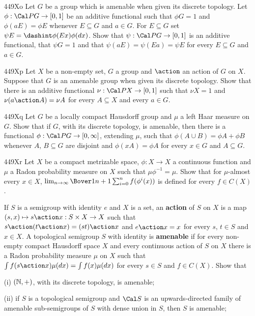 {\sqheader 449Xo Let $G$ be a group which is amenable when given its
discrete topology.   Let $\phi:\Cal PG\to[0,1]$ be an additive
functional such that $\phi G=1$ and $\phi(aE)=\phi E$ whenever
$E\subseteq G$ and $a\in G$.   For $E\subseteq G$ set
$\psi E=\dashint\phi(Ex)\phi(dx)$.   Show that
$\psi:\Cal PG\to[0,1]$ is an additive functional, that
$\psi G=1$ and that $\psi(aE)=\psi(Ea)=\psi E$ for
every $E\subseteq G$ and $a\in G$.

\spheader 449Xp Let $X$ be a non-empty set, $G$ a group and $\action$
an action of $G$ on $X$.   Suppose that $G$ is an amenable group when
given its discrete topology.   Show that there is an additive functional
$\nu:\Cal PX\to[0,1]$ such that $\nu X=1$ and
$\nu(a\action A)=\nu A$ for every $A\subseteq X$ and every $a\in G$.

\spheader 449Xq
Let $G$ be a locally compact Hausdorff group and
$\mu$ a left Haar measure on $G$.   Show that if $G$, with its discrete
topology, is amenable, then there is a functional
$\phi:\Cal PG\to[0,\infty]$, extending $\mu$, such that
$\phi(A\cup B)=\phi A+\phi B$ whenever $A$, $B\subseteq G$
are disjoint and $\phi(xA)=\phi A$ for every $x\in G$ and
$A\subseteq G$.

\spheader 449Xr Let $X$ be a compact metrizable space, $\phi:X\to X$ a
continuous function and $\mu$ a Radon probability measure on $X$ such
that $\mu\phi^{-1}=\mu$.   Show that for $\mu$-almost every $x\in X$,
$\lim_{n\to\infty}\Bover1{n+1}\sum_{i=0}^nf(\phi^i(x))$ is defined for
every $f\in C(X)$.   

If $S$ is a semigroup with identity $e$ and $X$ is a set, an
{\bf action} of $S$ on $X$ is a map
$(s,x)\mapsto s\action x:S\times X\to X$
such that $s\action(t\action x)=(st)\action x$ and $e\action x=x$ for
every $s$, $t\in S$ and $x\in X$.   A topological semigroup $S$ with
identity is {\bf amenable} if for every non-empty compact Hausdorff
space $X$ and every continuous action of $S$ on $X$ there is a Radon
probability measure $\mu$ on $X$ such that
$\int f(s\action x)\mu(dx)=\int f(x)\mu(dx)$ for every $s\in S$ and
$f\in C(X)$.   Show that

\quad(i) $(\Bbb N,+)$, with its discrete topology, is amenable;

\quad(ii) if $S$ is a topological semigroup and $\Cal S$ is an
upwards-directed family of amenable sub-semigroups of $S$ with dense
union in $S$, then $S$ is amenable;

}
